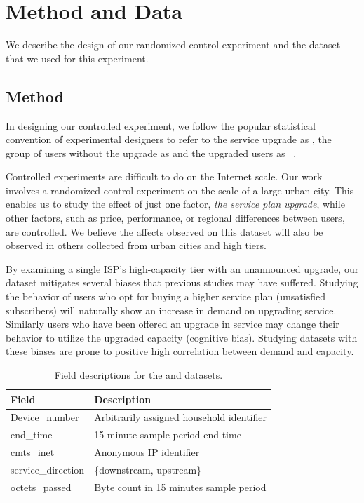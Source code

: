 \section{Method and Data}\label{sec:data}

We describe the design of our randomized control experiment and the
dataset that we used for this experiment.

\subsection{Method}

In designing our controlled experiment, we follow the popular
statistical convention of experimental designers to refer to the service
upgrade as \factor{}, the group of users without the upgrade as
\control{} and the upgraded users as \treatment{}~\cite{stats-design}.

Controlled experiments are difficult to do on the Internet scale.  Our
work involves a randomized control experiment on the scale of a large
urban city. This enables us to study the effect of just one factor,
\emph{the service plan upgrade}, while other factors, such as price,
performance, or regional differences between users, are controlled. We
believe the affects observed on this dataset will also be observed in
others collected from urban cities and high tiers.

By examining a single ISP's high-capacity tier with an unannounced upgrade,
our dataset mitigates several biases that previous studies may have 
suffered. Studying the behavior of users who opt for buying a higher service plan
(unsatisfied subscribers) will naturally show an increase in demand on
upgrading service\cite{dasu-imc2014}.
Similarly users who have been offered an
upgrade in service may change their behavior to utilize the upgraded capacity
(cognitive bias)\cite{zheleva2013}. Studying datasets with these biases are prone 
to positive high correlation between demand and capacity. 

\begin{table}[t]
\small
\begin{tabular}{ l l }
\hline
\textbf{Field}         & \textbf{Description}				\\\hline
Device\_number         & Arbitrarily assigned household identifier	\\
end\_time              & 15 minute sample period end time		\\
cmts\_inet             & Anonymous IP identifier			\\
service\_direction     & \{downstream, upstream\}                 	\\
octets\_passed         & Byte count in 15 minutes sample period		\\\hline
\end{tabular}
\caption{Field descriptions for the \control{} and \treatment{} datasets.}
\label{tab:field-description}
\end{table}

